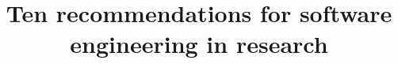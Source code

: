 \documentclass{bmcart}
\begin{document}
\begin{frontmatter}

\begin{fmbox}


\title{Ten recommendations for software engineering in research}


\author[
   addressref={aff1},                   %
   corref={aff1},                       %
   email={hastings@ebi.ac.uk}   %
]{ }
\author[
   addressref={aff1},
   email={kenneth@ebi.ac.uk}
]{ }
\author[
   addressref={aff1},
   email={steinbeck@ebi.ac.uk}
]{ }


\address[id=aff1]{%
  , %
  ,                     %
  ,                              %
}


\end{fmbox}
\end{frontmatter}
\end{document}
